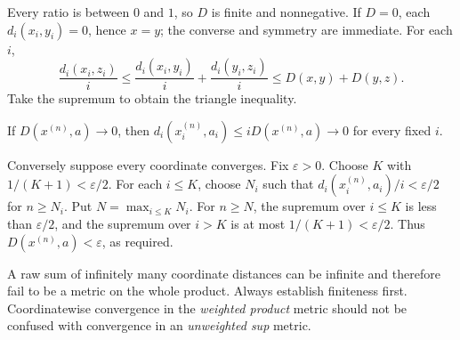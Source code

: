 \begin{answer}
Every ratio is between $0$ and $1$, so $D$ is finite and nonnegative. If $D=0$, each $d_i(x_i,y_i)=0$, hence $x=y$; the converse and symmetry are immediate. For each $i$,
\[\frac{d_i(x_i,z_i)}i\le\frac{d_i(x_i,y_i)}i+\frac{d_i(y_i,z_i)}i\le D(x,y)+D(y,z).\]
Take the supremum to obtain the triangle inequality.

If $D(x^{(n)},a)\to0$, then $d_i(x_i^{(n)},a_i)\le iD(x^{(n)},a)\to0$ for every fixed $i$.

Conversely suppose every coordinate converges. Fix $\varepsilon>0$. Choose $K$ with $1/(K+1)<\varepsilon/2$. For each $i\le K$, choose $N_i$ such that $d_i(x_i^{(n)},a_i)/i<\varepsilon/2$ for $n\ge N_i$. Put $N=\max_{i\le K}N_i$. For $n\ge N$, the supremum over $i\le K$ is less than $\varepsilon/2$, and the supremum over $i>K$ is at most $1/(K+1)<\varepsilon/2$. Thus $D(x^{(n)},a)<\varepsilon$, as required.
\end{answer}
\begin{tip}
A raw sum of infinitely many coordinate distances can be infinite and therefore fail to be a metric on the whole product. Always establish finiteness first. Coordinatewise convergence in the \emph{weighted product} metric should not be confused with convergence in an \emph{unweighted sup} metric.
\end{tip}


